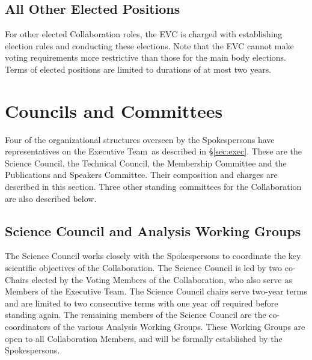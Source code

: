 \documentclass[12pt]{article}
\newcommand{\exec}{{Executive Team}}
\begin{document}

\subsection{All Other Elected Positions}
For other elected Collaboration roles, the EVC is charged with establishing election rules and conducting these elections. Note that the EVC cannot make voting requirements more restrictive than those for the main body elections. Terms of elected positions are limited to durations of at most two years. 

\section{Councils and Committees}
\label{sec:councils}
Four of the organizational structures overseen by the Spokespersons have representatives on the \exec\ as described in 
\S\ref{sec:exec}.  These are the Science Council, the Technical Council, the Membership Committee and the Publications and Speakers Committee.  Their composition and charges are described in this section.  Three other standing committees for the Collaboration %
are also described below.  

\subsection{Science Council and Analysis Working Groups}
\label{sec:SC}

The Science Council works closely with the Spokespersons to coordinate the key scientific objectives of the Collaboration.  The Science Council is led by two co-Chairs elected by the Voting Members of the Collaboration, who also serve as Members of the \exec. The Science Council chairs serve two-year terms and are limited to two consecutive terms with one year off required before standing again.
The remaining members of the Science Council are the co-coordinators of the various Analysis Working Groups. These Working Groups are open to all Collaboration Members, and will be formally established by the Spokespersons.  
\end{document}
